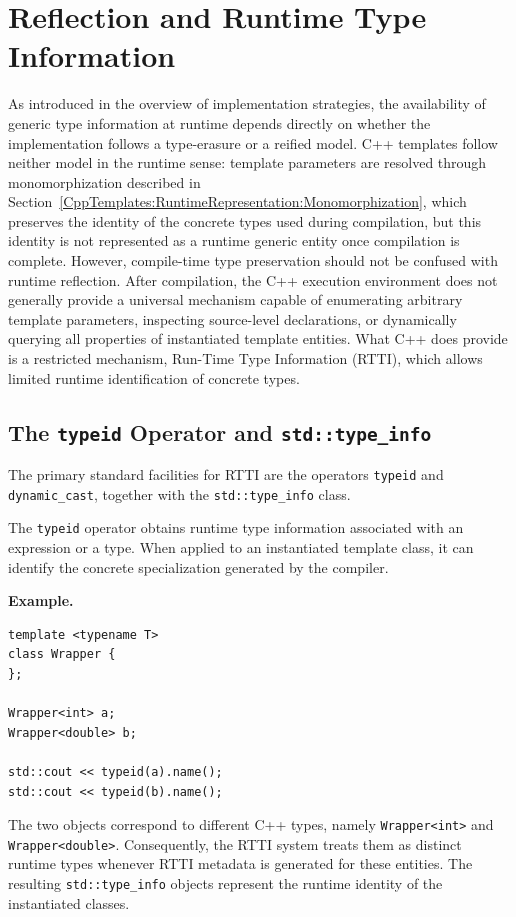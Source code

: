 \documentclass[11pt]{report}
\begin{document}
\section{Reflection and Runtime Type Information}
\label{CppTemplates:Reflection}

As introduced in the overview of implementation strategies, the availability
of generic type information at runtime depends directly on whether the
implementation follows a type-erasure or a reified model. C++ templates
follow neither model in the runtime sense: template parameters are resolved
through monomorphization described in Section~\ref{CppTemplates:RuntimeRepresentation:Monomorphization},
which preserves the identity of the concrete types used during compilation,
but this identity is not represented as a runtime generic entity once
compilation is complete.
However, compile-time type preservation should not be confused with runtime
reflection. After compilation, the C++ execution environment does not
generally provide a universal mechanism capable of enumerating arbitrary
template parameters, inspecting source-level declarations, or dynamically
querying all properties of instantiated template entities. What C++ does
provide is a restricted mechanism, Run-Time Type Information (RTTI), which
allows limited runtime identification of concrete types.

\subsection{The \texttt{typeid} Operator and \texttt{std::type\_info}}

The primary standard facilities for RTTI are the operators \texttt{typeid}
and \texttt{dynamic\_cast}, together with the \texttt{std::type\_info} class.

The \texttt{typeid} operator obtains runtime type information associated
with an expression or a type. When applied to an instantiated template
class, it can identify the concrete specialization generated by the
compiler.

\begin{examplebox}
\textbf{Example.}

\begin{lstlisting}
template <typename T>
class Wrapper {
};

Wrapper<int> a;
Wrapper<double> b;

std::cout << typeid(a).name();
std::cout << typeid(b).name();
\end{lstlisting}
The two objects correspond to different C++ types, namely \texttt{Wrapper<int>}
and \texttt{Wrapper<double>}. Consequently, the RTTI system treats them as
distinct runtime types whenever RTTI metadata is generated for these
entities. The resulting \texttt{std::type\_info} objects represent the
runtime identity of the instantiated classes.
\end{examplebox}
\end{document}
